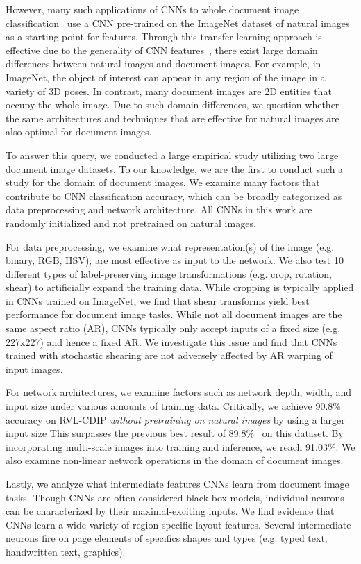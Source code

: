 \documentclass[10pt, conference, compsocconf]{IEEEtran}
\begin{document}
However, many such applications of CNNs to whole document image classification~\cite{harley15,afzal15,simon15} use a CNN pre-trained on the ImageNet dataset of natural images~\cite{russakovsky15} as a starting point for features.
Through this transfer learning approach is effective due to the generality of CNN features~\cite{sharif14}, there exist large domain differences between natural images and document images.
For example, in ImageNet, the object of interest can appear in any region of the image in a variety of 3D poses.
In contrast, many document images are 2D entities that occupy the whole image.
Due to such domain differences, we question whether the same architectures and techniques that are effective for natural images are also optimal for document images.

To answer this query, we conducted a large empirical study utilizing two large document image datasets.
To our knowledge, we are the first to conduct such a study for the domain of document images.
We examine many factors that contribute to CNN classification accuracy, which can be broadly categorized as data preprocessing and network architecture.
All CNNs in this work are randomly initialized and not pretrained on natural images.

For data preprocessing, we examine what representation(s) of the image (e.g. binary, RGB, HSV), are most effective as input to the network.
We also test 10 different types of label-preserving image transformations (e.g. crop, rotation, shear) to artificially expand the training data.
While cropping is typically applied in CNNs trained on ImageNet, we find that shear transforms yield best performance for document image tasks.
While not all document images are the same aspect ratio (AR), CNNs typically only accept inputs of a fixed size (e.g. 227x227) and hence a fixed AR.
We investigate this issue and find that CNNs trained with stochastic shearing are not adversely affected by AR warping of input images.

For network architectures, we examine factors such as network depth, width, and input size under various amounts of training data.
Critically, we achieve 90.8\% accuracy on RVL-CDIP \emph{without pretraining on natural images} by using a larger input size
This surpasses the previous best result of 89.8\%~\cite{harley15} on this dataset.
By incorporating multi-scale images into training and inference, we reach 91.03\%.
We also examine non-linear network operations in the domain of document images.


Lastly, we analyze what intermediate features CNNs learn from document image tasks.
Though CNNs are often considered black-box models, individual neurons can be characterized by their maximal-exciting inputs.
We find evidence that CNNs learn a wide variety of region-specific layout features.
Several intermediate neurons fire on page elements of specifics shapes and types (e.g. typed text, handwritten text, graphics).
\end{document}
